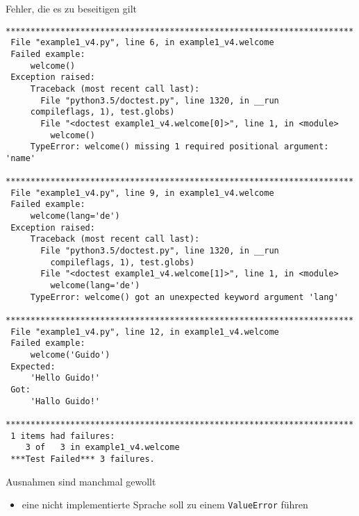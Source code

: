 \documentclass[t, utf8x, 10pt]{beamer}
\begin{document}
\begin{frame}[fragile]{Fehler, die es zu beseitigen gilt}
 \begin{tiny}
	 \begin{lstlisting}[language={}]
 **********************************************************************
 File "example1_v4.py", line 6, in example1_v4.welcome
 Failed example:
     welcome()
 Exception raised:
     Traceback (most recent call last):
       File "python3.5/doctest.py", line 1320, in __run
	 compileflags, 1), test.globs)
       File "<doctest example1_v4.welcome[0]>", line 1, in <module>
         welcome()
     TypeError: welcome() missing 1 required positional argument: 'name'
 **********************************************************************
 File "example1_v4.py", line 9, in example1_v4.welcome
 Failed example:
     welcome(lang='de')
 Exception raised:
     Traceback (most recent call last):
       File "python3.5/doctest.py", line 1320, in __run
         compileflags, 1), test.globs)
       File "<doctest example1_v4.welcome[1]>", line 1, in <module>
         welcome(lang='de')
     TypeError: welcome() got an unexpected keyword argument 'lang'
 **********************************************************************
 File "example1_v4.py", line 12, in example1_v4.welcome
 Failed example:
     welcome('Guido')
 Expected:
     'Hello Guido!'
 Got:
     'Hallo Guido!'
 **********************************************************************
 1 items had failures:
    3 of   3 in example1_v4.welcome
 ***Test Failed*** 3 failures.
  \end{lstlisting}
 \end{tiny}
\end{frame}


\begin{frame}{Ausnahmen sind manchmal gewollt}
 \begin{tiny}
  
 \end{tiny}

 \begin{itemize}
  \item eine nicht implementierte Sprache soll zu einem \texttt{ValueError} führen
 \end{itemize}
\end{frame}
\end{document}

